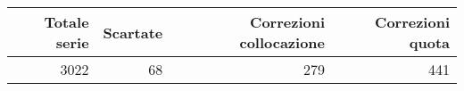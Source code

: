
\begin{tabular}{rrrr}
  \toprule
  Totale serie & Scartate & Correzioni collocazione & Correzioni quota\\
  \midrule
  3022 & 68 & 279 & 441\\
  \bottomrule
\end{tabular}

